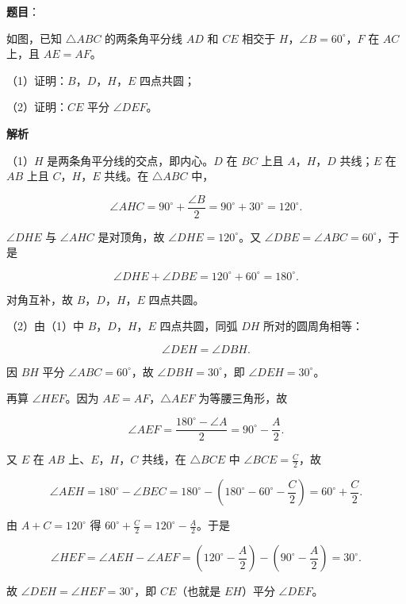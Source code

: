 \begin{answer}

\textbf{题目}：

如图，已知 $\triangle ABC$ 的两条角平分线 $AD$ 和 $CE$ 相交于 $H$，$\angle B=60^\circ$，$F$ 在 $AC$ 上，且 $AE=AF$。

（1）证明：$B$，$D$，$H$，$E$ 四点共圆；

（2）证明：$CE$ 平分 $\angle DEF$。
\nopagebreak[4]
\begin{center}\end{center}
\nopagebreak[4]
\textbf{解析}

（1）$H$ 是两条角平分线的交点，即内心。$D$ 在 $BC$ 上且 $A$，$H$，$D$ 共线；$E$ 在 $AB$ 上且 $C$，$H$，$E$ 共线。在 $\triangle ABC$ 中，

\nopagebreak[4]
\[\angle AHC=90^\circ+\frac{\angle B}{2}=90^\circ+30^\circ=120^\circ .\]

$\angle DHE$ 与 $\angle AHC$ 是对顶角，故 $\angle DHE=120^\circ$。又 $\angle DBE=\angle ABC=60^\circ$，于是

\nopagebreak[4]
\[\angle DHE+\angle DBE=120^\circ+60^\circ=180^\circ .\]

对角互补，故 $B$，$D$，$H$，$E$ 四点共圆。

（2）由（1）中 $B$，$D$，$H$，$E$ 四点共圆，同弧 $DH$ 所对的圆周角相等：

\nopagebreak[4]
\[\angle DEH=\angle DBH .\]

因 $BH$ 平分 $\angle ABC=60^\circ$，故 $\angle DBH=30^\circ$，即 $\angle DEH=30^\circ$。

再算 $\angle HEF$。因为 $AE=AF$，$\triangle AEF$ 为等腰三角形，故

\nopagebreak[4]
\[\angle AEF=\frac{180^\circ-\angle A}{2}=90^\circ-\frac A2 .\]

又 $E$ 在 $AB$ 上、$E$，$H$，$C$ 共线，在 $\triangle BCE$ 中 $\angle BCE=\frac C2$，故

\nopagebreak[4]
\[\angle AEH=180^\circ-\angle BEC=180^\circ-\left(180^\circ-60^\circ-\frac C2\right)=60^\circ+\frac C2 .\]

由 $A+C=120^\circ$ 得 $60^\circ+\frac C2=120^\circ-\frac A2$。于是

\nopagebreak[4]
\[\angle HEF=\angle AEH-\angle AEF=\left(120^\circ-\frac A2\right)-\left(90^\circ-\frac A2\right)=30^\circ .\]

故 $\angle DEH=\angle HEF=30^\circ$，即 $CE$（也就是 $EH$）平分 $\angle DEF$。


\end{answer}

